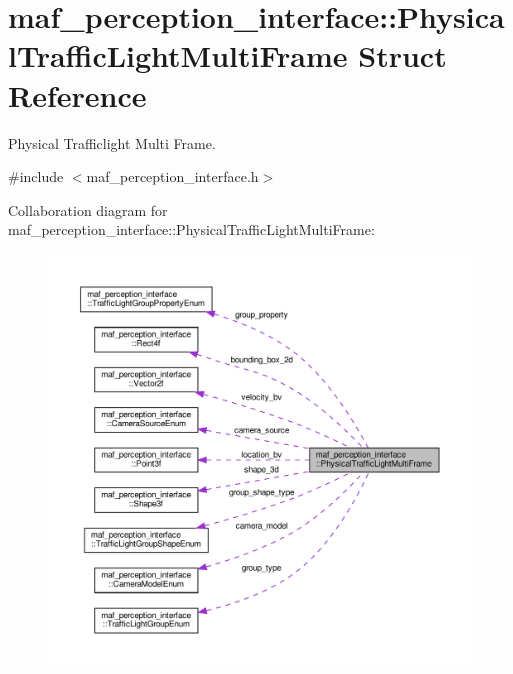 \hypertarget{structmaf__perception__interface_1_1PhysicalTrafficLightMultiFrame}{}\section{maf\+\_\+perception\+\_\+interface\+:\+:Physical\+Traffic\+Light\+Multi\+Frame Struct Reference}
\label{structmaf__perception__interface_1_1PhysicalTrafficLightMultiFrame}


Physical Trafficlight Multi Frame.  




{\ttfamily \#include $<$maf\+\_\+perception\+\_\+interface.\+h$>$}



Collaboration diagram for maf\+\_\+perception\+\_\+interface\+:\+:Physical\+Traffic\+Light\+Multi\+Frame\+:\nopagebreak
\begin{figure}[H]
\begin{center}
\leavevmode
\includegraphics[width=350pt]{structmaf__perception__interface_1_1PhysicalTrafficLightMultiFrame__coll__graph}
\end{center}
\end{figure}
